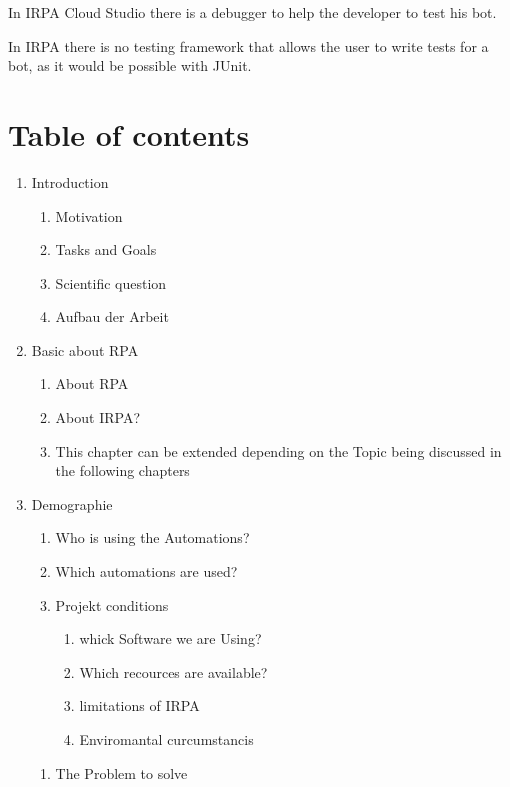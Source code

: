 In IRPA Cloud Studio there is a debugger to help the developer to test his bot.

In IRPA there is no testing framework that allows the user to write tests for a bot, as it would be possible with JUnit.
\newpage

\section{Table of contents}\label{sec:table-of-contents-v1.1}
\begin{enumerate}
    \item {Introduction}
    \begin{enumerate}
        \item {Motivation}
        \item {Tasks and Goals}
        \item {Scientific question}
        \item {Aufbau der Arbeit}
    \end{enumerate}
    \item {Basic about RPA}
    \begin{enumerate}
        \item {About RPA}
        \item {About IRPA?}
        \item {This chapter can be extended depending on the Topic being discussed in the following chapters }
    \end{enumerate}
    \item {Demographie}
    \begin{enumerate}
        \item {Who is using the Automations?}
        \item {Which automations are used?}
        \item Projekt conditions
        \begin{enumerate}
            \item {whick Software we are Using?}
            \item {Which recources are available?}
            \item {limitations of IRPA}
            \item {Enviromantal curcumstancis}
        \end{enumerate}
    \end{enumerate}
    \begin{enumerate}
        \item {The Problem to solve}
        \begin{enumerate}

\end{enumerate}
\end{enumerate}
\end{enumerate}
